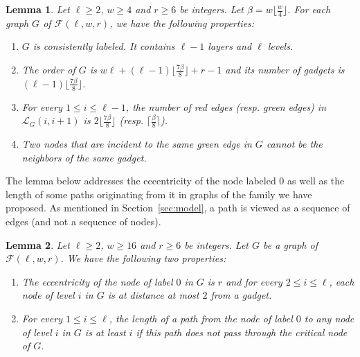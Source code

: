 \documentclass[11pt]{article}
\newtheorem{lemma}{Lemma}[section]
\begin{document}
\begin{lemma}
\label{lem:conse}
Let $\ell\geq 2$, $w\geq 4$ and $r\geq 6$ be integers. Let $\beta=w\lfloor\frac{w}{4}\rfloor$. For each graph $G$ of $\mathcal{F}(\ell,w,r)$, we have the following properties:
\begin{enumerate}
\item $G$ is consistently labeled. It contains $\ell-1$ layers and $\ell$ levels. 
\item The order of $G$ is $w\ell+ (\ell-1)\lfloor\frac{7\beta}{8}\rfloor+r-1$ and its number of gadgets is $(\ell-1)\lfloor\frac{7\beta}{8}\rfloor$.
\item For every $1\leq i \leq \ell-1$, the number of red edges (resp. green edges) in $\mathcal{L}_G(i,i+1)$ is $2\lfloor\frac{7\beta}{8}\rfloor$ (resp. $\lceil\frac{\beta}{8}\rceil$).
\item Two nodes that are incident to the same green edge in $G$ cannot be the neighbors of the same gadget.
\end{enumerate} 
\end{lemma}

The lemma below addresses the eccentricity of the node labeled $0$ as
well as the length of some paths originating from it in graphs of the
family we have proposed. As mentioned in Section~\ref{sec:model}, a path is viewed as a sequence of edges (and not a sequence of nodes).

\begin{lemma}
\label{lem:ecc}
Let $\ell\geq 2$, $w\geq 16$ and $r\geq 6$ be integers. Let $G$ be a graph of $\mathcal{F}(\ell,w,r)$. We have the following two properties:
\begin{enumerate}
\item The eccentricity of the node of label $0$ in $G$ is $r$ and for every $2\leq i\leq \ell$, each node of level $i$ in $G$ is at distance at most $2$ from a gadget.
\item For every $1\leq i\leq \ell$, the length of a path from the node of label $0$ to any node of level $i$ in $G$ is at least $i$ if this path does not pass through the critical node of $G$.
\end{enumerate}
\end{lemma}
\end{document}
